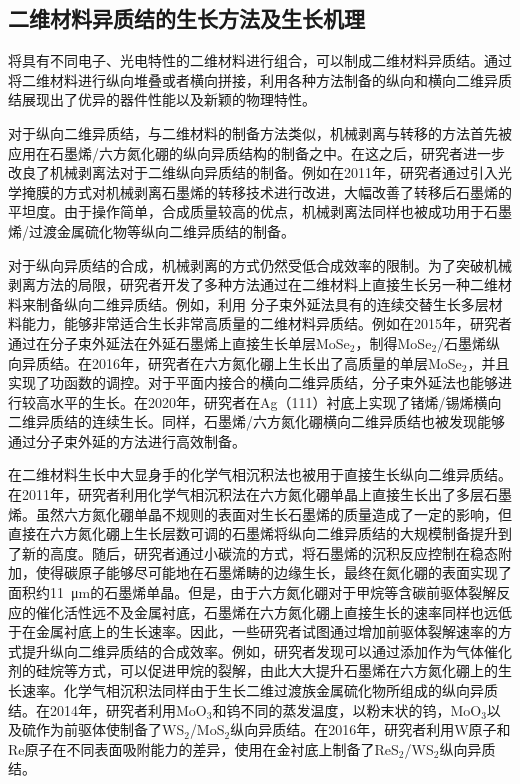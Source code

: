 
\subsection{二维材料异质结的生长方法及生长机理}
    将具有不同电子、光电特性的二维材料进行组合，可以制成二维材料异质结。通过将二维材料进行纵向堆叠或者横向拼接，利用各种方法制备的纵向和横向二维异质结展现出了优异的器件性能以及新颖的物理特性。

    对于纵向二维异质结，与二维材料的制备方法类似，机械剥离与转移的方法首先被应用在石墨烯/六方氮化硼的纵向异质结构的制备之中。在这之后，研究者进一步改良了机械剥离法对于二维纵向异质结的制备。例如在2011年，研究者通过引入光学掩膜的方式对机械剥离石墨烯的转移技术进行改进，大幅改善了转移后石墨烯的平坦度。由于操作简单，合成质量较高的优点，机械剥离法同样也被成功用于石墨烯/过渡金属硫化物等纵向二维异质结的制备。

    对于纵向异质结的合成，机械剥离的方式仍然受低合成效率的限制。为了突破机械剥离方法的局限，研究者开发了多种方法通过在二维材料上直接生长另一种二维材料来制备纵向二维异质结。例如，利用
    分子束外延法具有的连续交替生长多层材料能力，能够非常适合生长非常高质量的二维材料异质结。例如在2015年，研究者通过在分子束外延法在外延石墨烯上直接生长单层MoSe$_2$，制得MoSe$_2$/石墨烯纵向异质结。在2016年，研究者在六方氮化硼上生长出了高质量的单层MoSe$_2$，并且实现了功函数的调控。对于平面内接合的横向二维异质结，分子束外延法也能够进行较高水平的生长。在2020年，研究者在Ag（111）衬底上实现了锗烯/锡烯横向二维异质结的连续生长。同样，石墨烯/六方氮化硼横向二维异质结也被发现能够通过分子束外延的方法进行高效制备。

    在二维材料生长中大显身手的化学气相沉积法也被用于直接生长纵向二维异质结。在2011年，研究者利用化学气相沉积法在六方氮化硼单晶上直接生长出了多层石墨烯。虽然六方氮化硼单晶不规则的表面对生长石墨烯的质量造成了一定的影响，但直接在六方氮化硼上生长层数可调的石墨烯将纵向二维异质结的大规模制备提升到了新的高度。随后，研究者通过小碳流的方式，将石墨烯的沉积反应控制在稳态附加，使得碳原子能够尽可能地在石墨烯畴的边缘生长，最终在氮化硼的表面实现了面积约\SI{11}{\micro\metre}的石墨烯单晶。但是，由于六方氮化硼对于甲烷等含碳前驱体裂解反应的催化活性远不及金属衬底，石墨烯在六方氮化硼上直接生长的速率同样也远低于在金属衬底上的生长速率。因此，一些研究者试图通过增加前驱体裂解速率的方式提升纵向二维异质结的合成效率。例如，研究者发现可以通过添加作为气体催化剂的硅烷等方式，可以促进甲烷的裂解，由此大大提升石墨烯在六方氮化硼上的生长速率。化学气相沉积法同样由于生长二维过渡族金属硫化物所组成的纵向异质结。在2014年，研究者利用MoO$_3$和钨不同的蒸发温度，以粉末状的钨，MoO$_3$以及硫作为前驱体使制备了WS$_2$/MoS$_2$纵向异质结。在2016年，研究者利用W原子和Re原子在不同表面吸附能力的差异，使用在金衬底上制备了ReS$_2$/WS$_2$纵向异质结。

